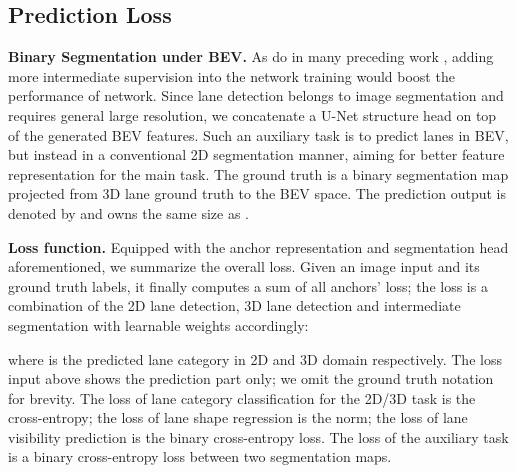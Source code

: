 \documentclass[runningheads]{llncs}
\begin{document}
\subsection{Prediction Loss}\label{sec: alg - loss}

\textbf{Binary Segmentation under BEV.} 
As do in many preceding work \cite{wei2016convolutional,newell2016stacked,huang2019apolloscape}, adding more intermediate supervision into the network training would
{boost the performance of network}.
Since lane detection belongs to image segmentation and requires general large resolution, 
we concatenate a U-Net structure \cite{ronneberger2015u} head on top of the generated BEV features. 
Such an auxiliary task is to predict lanes in BEV, but instead in a conventional 2D segmentation manner, aiming for better feature representation for the main task.
The ground truth  
is a binary segmentation map projected from 3D lane ground truth to the BEV space.
The prediction output is denoted by  and owns the same size as .






\textbf{Loss function.} 
Equipped with the anchor representation and segmentation head aforementioned, we summarize the overall loss.
Given an image input and its ground truth labels, 
it finally computes a sum of all anchors' loss;
the loss is a combination of the 2D lane detection, 3D lane detection and intermediate segmentation with learnable weights  accordingly:

where  is the predicted lane category in 2D and 3D domain respectively. The loss input above shows the prediction part only; we omit the ground truth notation for brevity.
The loss of lane category classification for the 2D/3D task is the cross-entropy; the loss of lane shape regression is the  norm; the loss of lane visibility prediction is the binary cross-entropy loss.
The loss of the auxiliary task is a binary cross-entropy loss between two segmentation maps.















 
\end{document}
